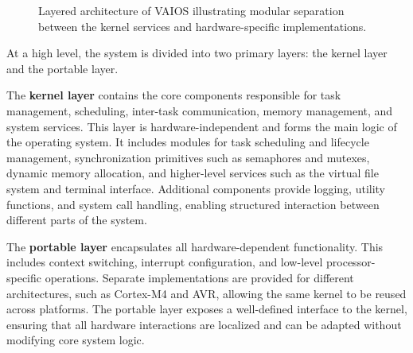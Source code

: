 \begin{figure}[H]
    \caption{Layered architecture of VAIOS illustrating modular separation between the kernel services and hardware-specific implementations.}
    \label{fig:vaios_architecture}
\end{figure}

At a high level, the system is divided into two primary layers: the kernel layer and the portable layer.

The \textbf{kernel layer} contains the core components responsible for task management, scheduling, inter-task communication, memory management, and system services. This layer is hardware-independent and forms the main logic of the operating system. It includes modules for task scheduling and lifecycle management, synchronization primitives such as semaphores and mutexes, dynamic memory allocation, and higher-level services such as the virtual file system and terminal interface. Additional components provide logging, utility functions, and system call handling, enabling structured interaction between different parts of the system.

The \textbf{portable layer} encapsulates all hardware-dependent functionality. This includes context switching, interrupt configuration, and low-level processor-specific operations. Separate implementations are provided for different architectures, such as Cortex-M4 and AVR, allowing the same kernel to be reused across platforms. The portable layer exposes a well-defined interface to the kernel, ensuring that all hardware interactions are localized and can be adapted without modifying core system logic.


